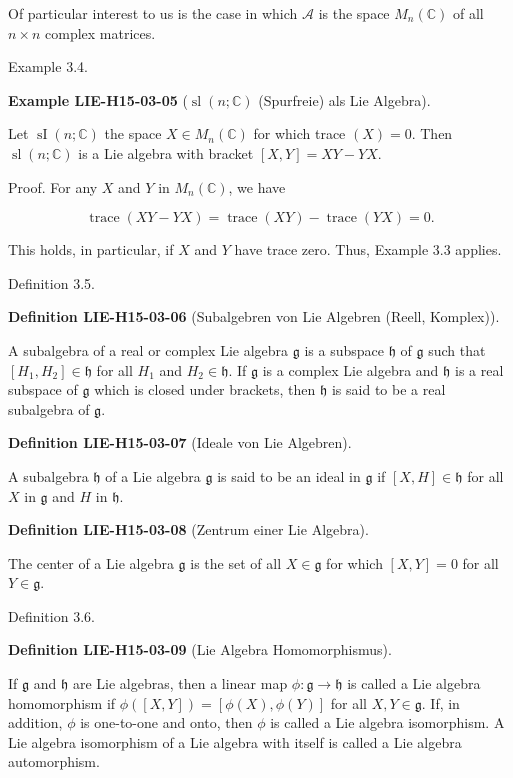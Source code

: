 \documentclass[10pt, letterpaper]{article}
\newcommand{\C}{\mathbb{C}}
\newcommand{\CustomHeading}[3]{%
  \par\medskip\noindent%
  \textbf{#1 #2} \textnormal{(#3)}.\enskip%
}
\newenvironment{DEF}[2]{\begin{unitbox}\CustomHeading{Definition}{#1}{#2}}{\end{unitbox}}
\newenvironment{EXA}[2]{\begin{unitbox}\CustomHeading{Example}{#1}{#2}}{\end{unitbox}}
\begin{document}
Of particular interest to us is the case in which $\mathcal{A}$ is the space $M_{n}(\mathbb{C})$ of all $n \times n$ complex matrices.

Example 3.4. 

\begin{EXA}{LIE-H15-03-05}{$\operatorname{sl}(n;\C)$ (Spurfreie) als Lie Algebra}
Let $\operatorname{sI}(n ; \mathbb{C})$ the space $X \in M_{n}(\mathbb{C})$ for which trace $(X)=0$. Then $\operatorname{sl}(n ; \mathbb{C})$ is a Lie algebra with bracket $[X, Y]=X Y-Y X$.

Proof. For any $X$ and $Y$ in $M_{n}(\mathbb{C})$, we have

$$
\operatorname{trace}(X Y-Y X)=\operatorname{trace}(X Y)-\operatorname{trace}(Y X)=0 .
$$

This holds, in particular, if $X$ and $Y$ have trace zero. Thus, Example 3.3 applies.
\end{EXA}


Definition 3.5. 

\begin{DEF}{LIE-H15-03-06}{Subalgebren von Lie Algebren (Reell, Komplex)}
A subalgebra of a real or complex Lie algebra $\mathfrak{g}$ is a subspace $\mathfrak{h}$ of $\mathfrak{g}$ such that $\left[H_{1}, H_{2}\right] \in \mathfrak{h}$ for all $H_{1}$ and $H_{2} \in \mathfrak{h}$. If $\mathfrak{g}$ is a complex Lie algebra and $\mathfrak{h}$ is a real subspace of $\mathfrak{g}$ which is closed under brackets, then $\mathfrak{h}$ is said to be a real subalgebra of $\mathfrak{g}$.
\end{DEF}

\begin{DEF}{LIE-H15-03-07}{Ideale von Lie Algebren}
A subalgebra $\mathfrak{h}$ of a Lie algebra $\mathfrak{g}$ is said to be an ideal in $\mathfrak{g}$ if $[X, H] \in \mathfrak{h}$ for all $X$ in $\mathfrak{g}$ and $H$ in $\mathfrak{h}$.
\end{DEF}

\begin{DEF}{LIE-H15-03-08}{Zentrum einer Lie Algebra}
The center of a Lie algebra $\mathfrak{g}$ is the set of all $X \in \mathfrak{g}$ for which $[X, Y]=0$ for all $Y \in \mathfrak{g}$.
\end{DEF}

Definition 3.6. 

\begin{DEF}{LIE-H15-03-09}{Lie Algebra Homomorphismus}
If $\mathfrak{g}$ and $\mathfrak{h}$ are Lie algebras, then a linear map $\phi: \mathfrak{g} \rightarrow \mathfrak{h}$ is called a Lie algebra homomorphism if $\phi([X, Y])=[\phi(X), \phi(Y)]$ for all $X, Y \in \mathfrak{g}$. If, in addition, $\phi$ is one-to-one and onto, then $\phi$ is called a Lie algebra isomorphism. A Lie algebra isomorphism of a Lie algebra with itself is called a Lie algebra automorphism.
\end{DEF}
\end{document}
